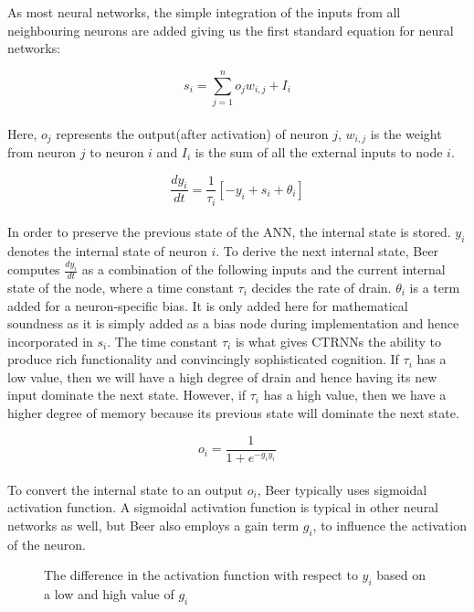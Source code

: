 As most neural networks, the simple integration of the inputs from all neighbouring neurons are added giving us the first standard equation for neural networks:

\begin{equation}
s_i = \sum_{j=1}^{n}o_{j}w_{i,j}+I_i
\end{equation}
\\
Here, $o_j$ represents the output(after activation) of neuron $j$, $w_{i,j}$ is the weight from neuron $j$ to neuron $i$ and $I_i$ is the sum of all the external inputs to node $i$.

\begin{equation}
\frac{dy_i}{dt} = \frac{1}{\tau_i}[-y_i + s_i + \theta_i]
\end{equation}
\\
In order to preserve the previous state of the ANN, the internal state is stored. 
$y_i$ denotes the internal state of neuron $i$.
To derive the next internal state, Beer computes $\frac{dy_i}{dt}$ as a combination of the following inputs and the current internal state of the node, where a time constant $\tau_i$ decides the rate of drain. 
$\theta_i$ is a term added for a neuron-specific bias.
It is only added here for mathematical soundness as it is simply added as a bias node during implementation and hence incorporated in $s_i$.
The time constant $\tau_i$ is what gives CTRNNs the ability to produce rich functionality and convincingly sophisticated cognition.
If $\tau_i$ has a low value, then we will have a high degree of drain and hence having its new input dominate the next state.
However, if $\tau_i$ has a high value, then we have a higher degree of memory because its previous state will dominate the next state.

\begin{equation}
o_i = \frac{1}{1 + e^{-g_{i}y_{i}}}
\end{equation}
\\
To convert the internal state to an output $o_i$, Beer typically uses sigmoidal activation function.
A sigmoidal activation function is typical in other neural networks as well, but Beer also employs a gain term $g_i$, to influence the activation of the neuron.
\\
\begin{figure}[H]
	\centering
	\caption{The difference in the activation function with respect to $y_i$ based on a low and high value of $g_i$}
	\label{CTRNN-gGraph}
\end{figure}

